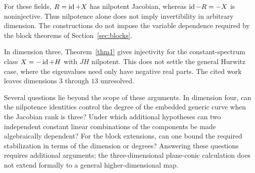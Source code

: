 For these fields, $R=\operatorname{id}+X$ has nilpotent Jacobian, whereas $\operatorname{id}-R=-X$ is noninjective. Thus nilpotence alone does not imply invertibility in arbitrary dimension. The constructions do not impose the variable dependence required by the block theorems of Section~\ref{sec:blocks}.

In dimension three, Theorem~\ref{thm1} gives injectivity for the constant-spectrum class $X=-\operatorname{id}+H$ with $JH$ nilpotent. This does not settle the general Hurwitz case, where the eigenvalues need only have negative real parts. The cited work leaves dimensions $3$ through $13$ unresolved.

Several questions lie beyond the scope of these arguments. In dimension four, can the nilpotence identities control the degree of the embedded generic curve when the Jacobian rank is three? Under which additional hypotheses can two independent constant linear combinations of the components be made algebraically dependent? For the block extensions, can one bound the required stabilization in terms of the dimension or degrees? Answering these questions requires additional arguments; the three-dimensional plane-conic calculation does not extend formally to a general higher-dimensional map.
